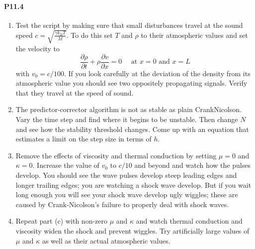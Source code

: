 \documentclass{book}
\theoremstyle{plain}
\theoremstyle{definition}
\numberwithin{exm}{chapter}
\theoremstyle{remark}
\theoremstyle{summary}
\theoremstyle{overview}
\begin{document}
\paragraph*{P11.4}
\begin{enumerate}[label=(\alph*)]
\item Test the script by making sure that small disturbances travel at the sound speed $c=\sqrt{\frac{\gamma k_{B} T}{M}}$. To do this set $T$ and $\rho$ to their atmospheric values and set the velocity to 
\begin{equation}\label{eq:1131}
\frac{\partial \rho}{\partial t}+\rho \frac{\partial v}{\partial x}=0 \quad \text { at } x=0 \text { and } x=L
\end{equation}
with $v_{0}=c / 100$. If you look carefully at the deviation of the density from its atmospheric value you should see two oppositely propagating signals. Verify that they travel at the speed of sound.

\item The predictor-corrector algorithm is not as stable as plain CrankNicolson. Vary the time step and find where it begins to be unstable. Then change $N$ and see how the stability threshold changes. Come up with an equation that estimates a limit on the step size in terms of $h$.

\item Remove the effects of viscosity and thermal conduction by setting $\mu=0$ and $\kappa=0$. Increase the value of $v_{0}$ to $c / 10$ and beyond and watch how the pulses develop. You should see the wave pulses develop steep leading edges and longer trailing edges; you are watching a shock wave develop. But if you wait long enough you will see your shock wave develop ugly wiggles; these are caused by Crank-Nicolson\rq s failure to properly deal with shock waves.

\item Repeat part (c) with non-zero $\mu$ and $\kappa$ and watch thermal conduction and viscosity widen the shock and prevent wiggles. Try artificially large values of $\mu$ and $\kappa$ as well as their actual atmospheric values.
\end{enumerate}
\end{document}
